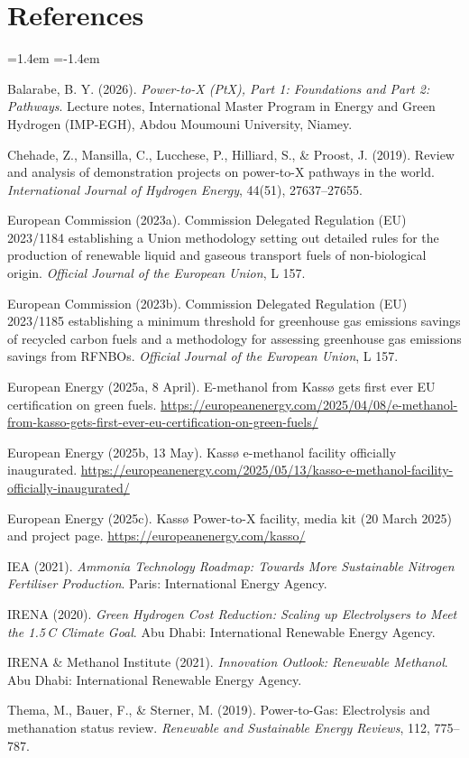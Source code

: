 \documentclass[11pt,a4paper]{article}
\begin{document}
\section{References}
{\small
\begin{list}{}{\leftmargin=1.4em \itemindent=-1.4em \itemsep=5pt \parsep=0pt}
\item Balarabe, B. Y. (2026). \emph{Power-to-X (PtX), Part 1: Foundations and Part 2: Pathways}. Lecture notes,
      International Master Program in Energy and Green Hydrogen (IMP-EGH), Abdou Moumouni University, Niamey.
\item Chehade, Z., Mansilla, C., Lucchese, P., Hilliard, S., \& Proost, J. (2019). Review and analysis of
      demonstration projects on power-to-X pathways in the world. \emph{International Journal of Hydrogen Energy},
      44(51), 27637--27655.
\item European Commission (2023a). Commission Delegated Regulation (EU) 2023/1184 establishing a Union methodology
      setting out detailed rules for the production of renewable liquid and gaseous transport fuels of non-biological
      origin. \emph{Official Journal of the European Union}, L 157.
\item European Commission (2023b). Commission Delegated Regulation (EU) 2023/1185 establishing a minimum threshold
      for greenhouse gas emissions savings of recycled carbon fuels and a methodology for assessing greenhouse gas
      emissions savings from RFNBOs. \emph{Official Journal of the European Union}, L 157.
\item European Energy (2025a, 8 April). E-methanol from Kassø gets first ever EU certification on green fuels.
      \url{https://europeanenergy.com/2025/04/08/e-methanol-from-kasso-gets-first-ever-eu-certification-on-green-fuels/}
\item European Energy (2025b, 13 May). Kassø e-methanol facility officially inaugurated.
      \url{https://europeanenergy.com/2025/05/13/kasso-e-methanol-facility-officially-inaugurated/}
\item European Energy (2025c). Kassø Power-to-X facility, media kit (20 March 2025) and project page.
      \url{https://europeanenergy.com/kasso/}
\item IEA (2021). \emph{Ammonia Technology Roadmap: Towards More Sustainable Nitrogen Fertiliser Production}.
      Paris: International Energy Agency.
\item IRENA (2020). \emph{Green Hydrogen Cost Reduction: Scaling up Electrolysers to Meet the 1.5\,\textdegree C
      Climate Goal}. Abu Dhabi: International Renewable Energy Agency.
\item IRENA \& Methanol Institute (2021). \emph{Innovation Outlook: Renewable Methanol}. Abu Dhabi: International
      Renewable Energy Agency.
\item Thema, M., Bauer, F., \& Sterner, M. (2019). Power-to-Gas: Electrolysis and methanation status review.
      \emph{Renewable and Sustainable Energy Reviews}, 112, 775--787.
\end{list}}
\end{document}
